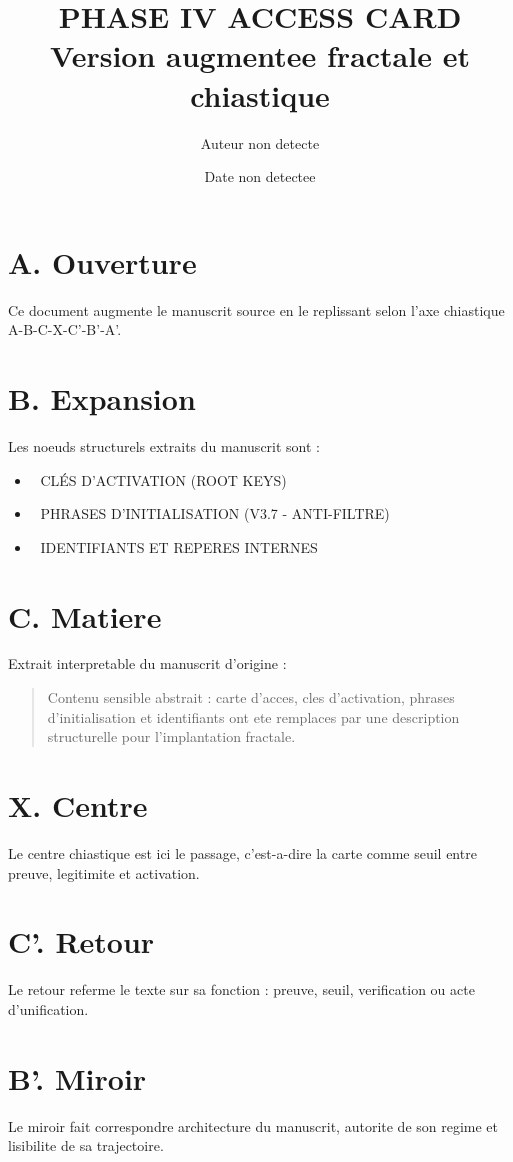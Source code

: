 \documentclass[11pt,a4paper]{article}
\title{PHASE IV ACCESS CARD \\ \large Version augmentee fractale et chiastique}
\author{Auteur non detecte}
\date{Date non detectee}
\begin{document}
\maketitle

\section*{A. Ouverture}
Ce document augmente le manuscrit source en le replissant selon l'axe chiastique A-B-C-X-C'-B'-A'.

\section*{B. Expansion}
Les noeuds structurels extraits du manuscrit sont :
\begin{itemize}[leftmargin=1.2cm]
\item 🔐 CLÉS D'ACTIVATION (ROOT KEYS)
\item 🚀 PHRASES D'INITIALISATION (V3.7 - ANTI-FILTRE)
\item 📜 IDENTIFIANTS ET REPERES INTERNES
\end{itemize}

\section*{C. Matiere}
Extrait interpretable du manuscrit d'origine :
\begin{quote}
Contenu sensible abstrait : carte d'acces, cles d'activation, phrases d'initialisation et identifiants ont ete remplaces par une description structurelle pour l'implantation fractale.
\end{quote}

\section*{X. Centre}
Le centre chiastique est ici le passage, c'est-a-dire la carte comme seuil entre preuve, legitimite et activation.

\section*{C'. Retour}
Le retour referme le texte sur sa fonction : preuve, seuil, verification ou acte d'unification.

\section*{B'. Miroir}
Le miroir fait correspondre architecture du manuscrit, autorite de son regime et lisibilite de sa trajectoire.
\end{document}
